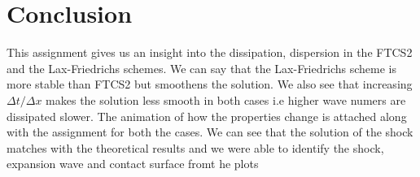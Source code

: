 \documentclass[11pt, a4paper]{article}
\begin{document}
\section{Conclusion}
This assignment gives us an insight into the dissipation, dispersion in the FTCS2 and the Lax-Friedrichs schemes. We can say
that the Lax-Friedrichs scheme is more stable than FTCS2 but smoothens the solution. We also see that increasing $\Delta t/
\Delta x$ makes the solution less smooth in both cases i.e higher wave numers are dissipated slower. The animation of how the
properties change is attached along with the assignment for both the cases.
We can see that the solution of the shock matches with the theoretical results and we were able to identify the shock, 
expansion wave and contact surface fromt he plots
\end{document}
